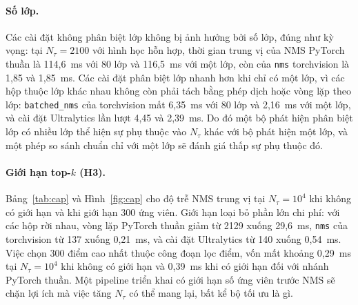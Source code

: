 \documentclass[a4paper,fleqn]{cas-dc}
\newcommand{\Ntau}{N_{\tau}}
\begin{document}
\paragraph{Số lớp.}
Các cài đặt không phân biệt lớp không bị ảnh hưởng bởi số lớp, đúng như kỳ vọng: tại $\Ntau=2100$ với hình học hỗn hợp, thời gian trung vị của NMS PyTorch thuần là 114,6~ms với 80 lớp và 116,5~ms với một lớp, còn của \texttt{nms} torchvision là 1,85 và 1,85~ms. Các cài đặt phân biệt lớp nhanh hơn khi chỉ có một lớp, vì các hộp thuộc lớp khác nhau không còn phải tách bằng phép dịch hoặc vòng lặp theo lớp: \texttt{batched\_nms} của torchvision mất 6,35~ms với 80 lớp và 2,16~ms với một lớp, và cài đặt Ultralytics lần lượt 4,45 và 2,39~ms. Do đó một bộ phát hiện phân biệt lớp có nhiều lớp thể hiện sự phụ thuộc vào $\Ntau$ khác với bộ phát hiện một lớp, và một phép so sánh chuẩn chỉ với một lớp sẽ đánh giá thấp sự phụ thuộc đó.

\paragraph{Giới hạn top-$k$ (H3).}
Bảng~\ref{tab:cap} và Hình~\ref{fig:cap} cho độ trễ NMS trung vị tại $\Ntau=10^4$ khi không có giới hạn và khi giới hạn 300 ứng viên. Giới hạn loại bỏ phần lớn chi phí: với các hộp rời nhau, vòng lặp PyTorch thuần giảm từ 2129 xuống 29,6~ms, \texttt{nms} của torchvision từ 137 xuống 0,21~ms, và cài đặt Ultralytics từ 140 xuống 0,54~ms. Việc chọn 300 điểm cao nhất thuộc công đoạn lọc điểm, vốn mất khoảng 0,29~ms tại $\Ntau=10^4$ khi không có giới hạn và 0,39~ms khi có giới hạn đối với nhánh PyTorch thuần. Một pipeline triển khai có giới hạn số ứng viên trước NMS sẽ chặn lợi ích mà việc tăng $\Ntau$ có thể mang lại, bất kể bộ tối ưu là gì.
\end{document}
